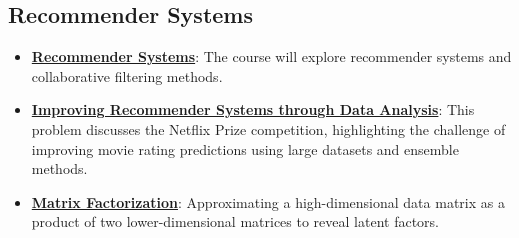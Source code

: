 \documentclass{article}%
\begin{document}
%
\subsection{Recommender Systems}%
\label{subsec:RecommenderSystems}%
\begin{itemize}[leftmargin=*]%
\item \href{https://purdue.brightspace.com/d2l/common/assets/pdfjs-d2l-dist/1.0.14-legacy/web/viewer.html?file=\%2Fcontent\%2Fenforced\%2F1095465-WL.202510.CS24200.LE1\%2F01L1-introduction.pdf\%3Fou\%3D1095465\&lang=en-us\&container=d2l-fileviewer-rendered-pdf\&fullscreen=d2l-fileviewer-rendered-pdf-dialog\&height=667#page=4}{\textbf{Recommender Systems}}: The course will explore recommender systems and collaborative filtering methods.%
\item \href{https://purdue.brightspace.com/d2l/common/assets/pdfjs-d2l-dist/1.0.14-legacy/web/viewer.html?file=\%2Fcontent\%2Fenforced\%2F1095465-WL.202510.CS24200.LE1\%2F02L1-datas-intro.pdf\%3Fou\%3D1095465\&lang=en-us\&container=d2l-fileviewer-rendered-pdf\&fullscreen=d2l-fileviewer-rendered-pdf-dialog\&height=667#page=14}{\textbf{Improving Recommender Systems through Data Analysis}}: This problem discusses the Netflix Prize competition, highlighting the challenge of improving movie rating predictions using large datasets and ensemble methods.%
\item \href{https://purdue.brightspace.com/d2l/common/assets/pdfjs-d2l-dist/1.0.14-legacy/web/viewer.html?file=\%2Fcontent\%2Fenforced\%2F1095465-WL.202510.CS24200.LE1\%2F242-19-svd-pca.pdf\%3Fou\%3D1095465\&lang=en-us\&container=d2l-fileviewer-rendered-pdf\&fullscreen=d2l-fileviewer-rendered-pdf-dialog\&height=667#page=3}{\textbf{Matrix Factorization}}: Approximating a high-dimensional data matrix as a product of two lower-dimensional matrices to reveal latent factors.%
\end{itemize}

%
\end{document}
